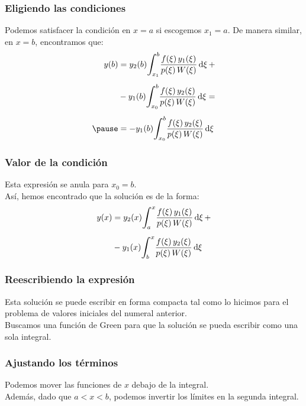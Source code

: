 \documentclass[12pt]{beamer}
\begin{document}
\begin{frame}
\frametitle{Eligiendo las condiciones}
Podemos satisfacer la condición en $x = a$ si escogemos $x_{1} = a$. \pause De manera similar, en $x = b$, encontramos que:
\pause
\begin{eqnarray}
\begin{aligned}[b]
y (b) &= y_{2} (b) \scaleint{6ex}_{\bs x_{1}}^{b} \dfrac{f (\xi) \, y_{1} (\xi)}{p (\xi) \, W (\xi)} \dd{\xi} + \\[0.5em]
&- y_{1} (b) \scaleint{6ex}_{\bs x_{0}}^{b} \dfrac{f (\xi) \, y_{2} (\xi)}{p (\xi) \, W (\xi)} \dd{\xi} = \\[0.5em] \pause
&= - y_{1} (b) \scaleint{6ex}_{\bs x_{0}}^{b} \dfrac{f (\xi) \, y_{2} (\xi)}{p (\xi) \, W (\xi)} \dd{\xi}
\end{aligned}
\label{eq:ecuacion_07_28}
\end{eqnarray}
\end{frame}

\begin{frame}
\frametitle{Valor de la condición}
Esta expresión se anula para $x_{0} = b$.
\\
\bigskip
\pause
Así, hemos encontrado que la solución es de la forma:
\pause
\begin{align}
\begin{aligned}[b]
y (x) &= y_{2} (x) \scaleint{6ex}_{\bs a}^{x} \dfrac{f (\xi) \, y_{1} (\xi)}{p (\xi) \, W (\xi)} \dd{\xi} + \\[0.5em]
&- y_{1} (x) \scaleint{6ex}_{\bs b}^{x} \dfrac{f (\xi) \, y_{2} (\xi)}{p (\xi) \, W (\xi)} \dd{\xi}
\end{aligned}
\label{eq:ecuacion_07_29}
\end{align}
\end{frame}

\begin{frame}
\frametitle{Reescribiendo la expresión}
Esta solución se puede escribir en forma compacta tal como lo hicimos para el problema de valores iniciales del numeral anterior.
\\
\bigskip
\pause
Buscamos una función de Green para que la solución se pueda escribir como una sola integral.
\end{frame}

\begin{frame}
\frametitle{Ajustando los términos}
Podemos mover las funciones de $x$ debajo de la integral.
\\
\bigskip
\pause
Además, dado que $a < x < b$, podemos invertir los límites en la segunda integral.
\end{frame}
\end{document}
